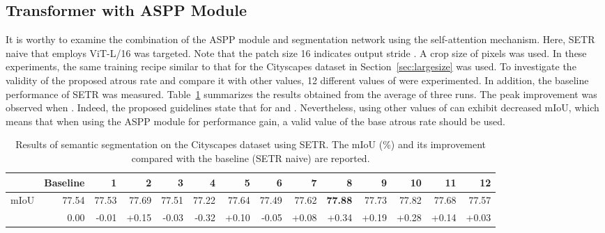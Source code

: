 \documentclass{article}
\def\secref#1{Section~\ref{#1}}
\def\tabref#1{Table~\ref{#1}}
\begin{document}
\subsection{Transformer with ASPP Module} It is worthy to examine the combination of the ASPP module and segmentation network using the self-attention mechanism. Here, SETR naive that employs ViT-L/16 was targeted. Note that the patch size 16 indicates output stride . A crop size of  pixels was used. In these experiments, the same training recipe similar to that for the Cityscapes dataset in \secref{sec:largesize} was used. To investigate the validity of the proposed atrous rate  and compare it with other values, 12 different values of  were experimented. In addition, the baseline performance of SETR was measured. \tabref{tab:setr} summarizes the results obtained from the average of three runs. The peak improvement was observed when . Indeed, the proposed guidelines state that  for  and . Nevertheless, using other values of  can exhibit decreased mIoU, which means that when using the ASPP module for performance gain, a valid value of the base atrous rate should be used.

\begin{table}[t!]
	\caption{Results of semantic segmentation on the Cityscapes dataset using SETR. The mIoU (\%) and its improvement  compared with the baseline (SETR naive) are reported.}
	\label{tab:setr}
	\centering
    \begin{adjustbox}{width=\textwidth,center}
	\begin{tabular}{c|rrrrrrrrrrrrr}
		\toprule
		      & Baseline & 1     & 2     & 3     & 4     & 5     & 6     & 7     & 8          & 9     & 10    & 11    & 12    \\
		\midrule
		mIoU     & 77.54    & 77.53 & 77.69 & 77.51 & 77.22 & 77.64 & 77.49 & 77.62 & \textbf{77.88} & 77.73 & 77.82 & 77.68 & 77.57 \\
		 & 0.00     & -0.01 & +0.15 & -0.03 & -0.32 & +0.10 & -0.05 & +0.08 & +0.34          & +0.19 & +0.28 & +0.14 & +0.03 \\
		\bottomrule
	\end{tabular}
    \end{adjustbox}
\end{table}
\end{document}
